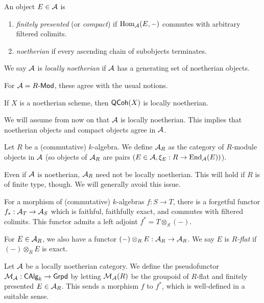 \documentclass{amsart}
\begin{document}
\begin{dfn}
	An object $E \in \mathcal{A}$ is
	\begin{enumerate}
		\item \emph{finitely presented} (or \emph{compact}) if $\operatorname{Hom}_{\mathcal{A}}(E, -)$ commutes with arbitrary filtered colimits.
		\item \emph{noetherian} if every ascending chain of subobjects terminates.
	\end{enumerate}
	We say $\mathcal{A}$ is \emph{locally noetherian} if $\mathcal{A}$ has a generating set of noetherian objects.
\end{dfn}

\begin{ex}
	For $\mathcal{A} = R\textrm{-}\mathsf{Mod}$, these agree with the usual notions.
\end{ex}

\begin{ex}
	If $X$ is a noetherian scheme, then $\mathsf{QCoh}(X)$ is locally noetherian.
\end{ex}

We will assume from now on that $\mathcal{A}$ is locally noetherian.
This implies that noetherian objects and compact objects agree in $\mathcal{A}$.

\begin{dfn}
	Let $R$ be a (commutative) $k$-algebra.
	We define $\mathcal{A}_R$ as the category of $R$-module objects in $\mathcal{A}$ (so objects of $\mathcal{A}_R$ are pairs $(E \in \mathcal{A}, \xi_E: R \to \operatorname{End}_{\mathcal{A}}(E))$).
\end{dfn}

Even if $\mathcal{A}$ is noetherian, $\mathcal{A}_R$ need not be locally noetherian.
This will hold if $R$ is of finite type, though.
We will generally avoid this issue.

For a morphism of (commutative) $k$-algebras $f: S \to T$, there is a forgetful functor $f_*: \mathcal{A}_T \to \mathcal{A}_S$ which is faithful, faithfully exact, and commutes with filtered colimits.
This functor admits a left adjoint $f^* = T \otimes_S (-)$.

For $E \in \mathcal{A}_R$, we also have a functor $(-) \otimes_R E: \mathcal{A}_R \to \mathcal{A}_R$.
We say $E$ is \emph{$R$-flat} if $(-) \otimes_R E$ is exact.

\begin{dfn}
	Let $\mathcal{A}$ be a locally noetherian category.
	We define the pseudofunctor $\mathcal{M}_{\mathcal{A}}: \mathsf{CAlg}_k \to \mathsf{Grpd}$ by letting $\mathcal{M}_{\mathcal{A}}(R)$ be the groupoid of $R$-flat and finitely presented $E \in \mathcal{A}_R$.
	This sends a morphism $f$ to $f^*$, which is well-defined in a suitable sense.
\end{dfn}
\end{document}

